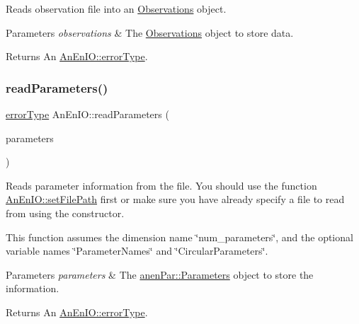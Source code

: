 Reads observation file into an \mbox{\hyperlink{class_observations}{Observations}} object.


\begin{DoxyParams}{Parameters}
{\em observations} & The \mbox{\hyperlink{class_observations}{Observations}} object to store data. \\
\hline
\end{DoxyParams}
\begin{DoxyReturn}{Returns}
An \mbox{\hyperlink{class_an_en_i_o_aa56bc1ec6610b86db4349bce20f9ead0}{An\+En\+I\+O\+::error\+Type}}. 
\end{DoxyReturn}
\mbox{\label{class_an_en_i_o_a2b21ff04fcc0464017a5a717a6b19065}} 
\subsubsection{\texorpdfstring{read\+Parameters()}{readParameters()}}
{\footnotesize\ttfamily \mbox{\hyperlink{class_an_en_i_o_aa56bc1ec6610b86db4349bce20f9ead0}{error\+Type}} An\+En\+I\+O\+::read\+Parameters (\begin{DoxyParamCaption}\item[{\mbox{\hyperlink{classanen_par_1_1_parameters}{anen\+Par\+::\+Parameters}} \&}]{parameters }\end{DoxyParamCaption})}

Reads parameter information from the file. You should use the function \mbox{\hyperlink{class_an_en_i_o_a98066d375cc78694fda2af1ce37cc8d8}{An\+En\+I\+O\+::set\+File\+Path}} first or make sure you have already specify a file to read from using the constructor.

This function assumes the dimension name \char`\"{}num\+\_\+parameters\char`\"{}, and the optional variable names \char`\"{}\+Parameter\+Names\char`\"{} and \char`\"{}\+Circular\+Parameters\char`\"{}.


\begin{DoxyParams}{Parameters}
{\em parameters} & The \mbox{\hyperlink{classanen_par_1_1_parameters}{anen\+Par\+::\+Parameters}} object to store the information. \\
\hline
\end{DoxyParams}
\begin{DoxyReturn}{Returns}
An \mbox{\hyperlink{class_an_en_i_o_aa56bc1ec6610b86db4349bce20f9ead0}{An\+En\+I\+O\+::error\+Type}}. 
\end{DoxyReturn}
\mbox{\label{class_an_en_i_o_aaec8b46a52f3d8ab904fd4229bd3b9e9}} 
